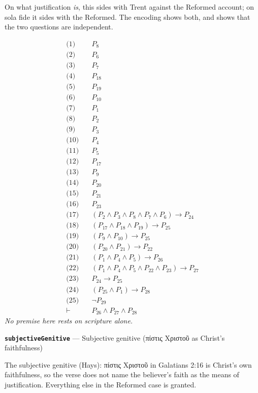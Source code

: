 \documentclass[11pt]{article}
\begin{document}
On what justification \emph{is}, this sides with Trent against the Reformed account; on sola fide it sides with the Reformed. The encoding shows both, and shows that the two questions are independent.

\begin{align*}
  \text{(1)} \quad & P_{8} \\
  \text{(2)} \quad & P_{6} \\
  \text{(3)} \quad & P_{7} \\
  \text{(4)} \quad & P_{18} \\
  \text{(5)} \quad & P_{19} \\
  \text{(6)} \quad & P_{10} \\
  \text{(7)} \quad & P_{1} \\
  \text{(8)} \quad & P_{2} \\
  \text{(9)} \quad & P_{3} \\
  \text{(10)} \quad & P_{4} \\
  \text{(11)} \quad & P_{5} \\
  \text{(12)} \quad & P_{17} \\
  \text{(13)} \quad & P_{9} \\
  \text{(14)} \quad & P_{20} \\
  \text{(15)} \quad & P_{21} \\
  \text{(16)} \quad & P_{23} \\
  \text{(17)} \quad & (P_{2} \land P_{3} \land P_{8} \land P_{7} \land P_{6}) \rightarrow P_{24} \\
  \text{(18)} \quad & (P_{17} \land P_{18} \land P_{19}) \rightarrow P_{25} \\
  \text{(19)} \quad & (P_{9} \land P_{10}) \rightarrow P_{25} \\
  \text{(20)} \quad & (P_{20} \land P_{21}) \rightarrow P_{22} \\
  \text{(21)} \quad & (P_{1} \land P_{4} \land P_{5}) \rightarrow P_{26} \\
  \text{(22)} \quad & (P_{1} \land P_{4} \land P_{5} \land P_{22} \land P_{23}) \rightarrow P_{27} \\
  \text{(23)} \quad & P_{24} \rightarrow P_{25} \\
  \text{(24)} \quad & (P_{25} \land P_{1}) \rightarrow P_{28} \\
  \text{(25)} \quad & \lnot P_{29} \\
  \vdash \quad & P_{26} \land P_{27} \land P_{28}
\end{align*}
\emph{No premise here rests on scripture alone.}
\par\medskip\noindent\textbf{\texttt{subjective\allowbreak{}Genitive}} --- Subjective genitive (πίστις Χριστοῦ as Christ's faithfulness)\par\nobreak\noindent
The subjective genitive (Hays): πίστις Χριστοῦ in Galatians 2:16 is Christ's own faithfulness, so the verse does not name the believer's faith as the means of justification. Everything else in the Reformed case is granted.
\end{document}
